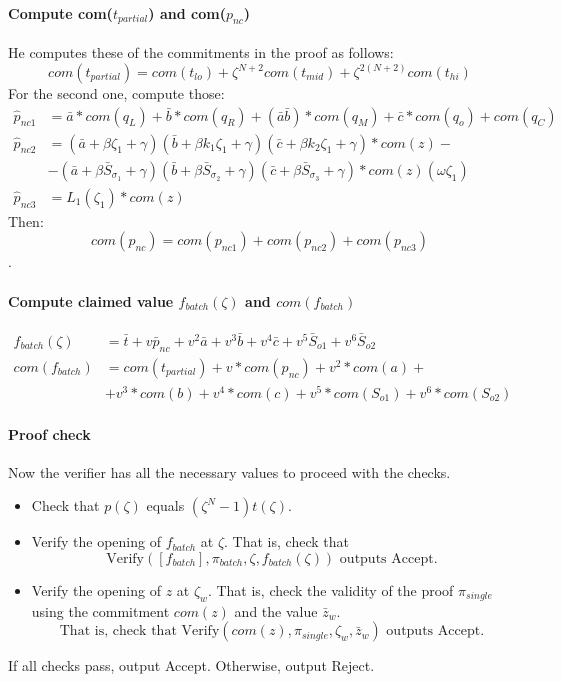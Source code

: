 \documentclass[../lecture-notes.tex]{subfiles}
\begin{document}
\paragraph{Compute com($t_{partial}$) and com($p_{nc}$)}
He computes these of the commitments in the proof as follows:
\[com(t_{partial}) = com(t_{lo}) + \zeta^{N+2}com(t_{mid}) + \zeta^{2(N+2)}com(t_{hi})\]
For the second one, compute those:
\begin{align*}
\hat{p}_{nc1} &= \bar{a} * com(q_L) + \bar{b} * com(q_R) + (\bar{a}\bar{b}) * com(q_M) + \bar{c} * com(q_o) + com(q_C) \\
\hat{p}_{nc2} &= (\bar{a} + \beta \zeta_1 + \gamma)(\bar{b} + \beta k_1 \zeta_1 + \gamma)(\bar{c} + \beta k_2 \zeta_1 + \gamma) * com(z) - \\ 
&- (\bar{a} + \beta \bar{S}_{\sigma_1} + \gamma)(\bar{b} + \beta \bar{S}_{\sigma_2} + \gamma)(\bar{c} + \beta \bar{S}_{\sigma_3} + \gamma) * com(z)(\omega \zeta_1) \\
\hat{p}_{nc3} &= L_1(\zeta_1) * com(z)
\end{align*}
Then: \[com(p_{nc}) = com(p_{nc1}) + com(p_{nc2}) + com(p_{nc3})\].

\paragraph{Compute claimed value $f_{batch}(\zeta)$ and $com(f_{batch})$}

\begin{align*}
f_{batch}(\zeta) &= \bar{t} + v \bar{p}_{nc} + v^2 \bar{a} + v^3 \bar{b} + v^4 \bar{c} + v^5 \bar{S}_{o1} + v^6 \bar{S}_{o2} \\
com(f_{batch}) &= com(t_{partial}) + v * com(p_{nc}) + v^2 * com(a) + \\
&+ v^3 * com(b) + v^4 * com(c) + v^5 * com(S_{o1}) + v^6 * com(S_{o2})
\end{align*}
\paragraph{Proof check}

Now the verifier has all the necessary values to proceed with the checks.

\begin{itemize}
    \item Check that $p(\zeta)$ equals $(\zeta^N - 1)t(\zeta)$.
    \item Verify the opening of $f_{batch}$ at $\zeta$. That is, check that 
        \begin{equation*}
            \text{Verify}([f_{batch}], \pi_{batch}, \zeta, f_{batch}(\zeta)) \text{ outputs Accept.}
        \end{equation*}
    \item Verify the opening of $z$ at $\zeta_w$. That is, check the validity of the proof $\pi_{single}$ using the commitment $com(z)$ and the value $\bar{z}_w$. 
        \begin{equation*}
            \text{That is, check that } \text{Verify}(com(z), \pi_{single}, \zeta_w, \bar{z}_w) \text{ outputs Accept.}
        \end{equation*}
\end{itemize}

If all checks pass, output Accept. Otherwise, output Reject.
\end{document}

